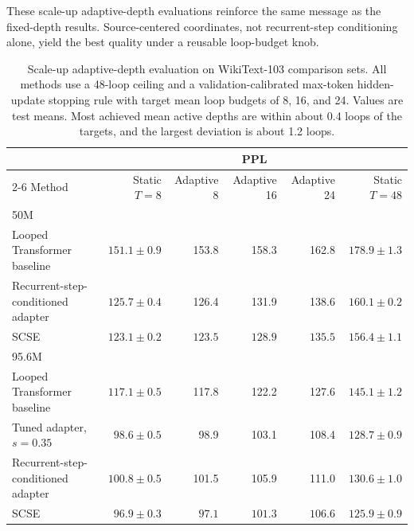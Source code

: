 \documentclass[letterpaper]{article} %
\newcommand{\SCSE}{\textsc{SCSE}}
\theoremstyle{remark}
\begin{document}
These scale-up adaptive-depth evaluations reinforce the same message as the fixed-depth results.  Source-centered coordinates, not recurrent-step conditioning alone, yield the best quality under a reusable loop-budget knob.

\begin{table}[t!]
	\centering
	\scriptsize
	\begin{tabular}{lrrrrr}
		\toprule
		                                   & \multicolumn{5}{c}{PPL}                                                                                   \\
		\cmidrule(lr){2-6}
		Method                             & Static $T=8$            & Adaptive 8       & Adaptive 16      & Adaptive 24      & Static $T=48$          \\
		\midrule
		\multicolumn{6}{l}{50M}                                                                                                                        \\
		Looped Transformer baseline        & $151.1\pm0.9$           & 153.8            & 158.3            & 162.8            & $178.9\pm1.3$          \\
		Recurrent-step-conditioned adapter & $125.7\pm0.4$           & 126.4            & 131.9            & 138.6            & $160.1\pm0.2$          \\
		\SCSE{}                            & $\mathbf{123.1\pm0.2}$  & $\mathbf{123.5}$ & $\mathbf{128.9}$ & $\mathbf{135.5}$ & $\mathbf{156.4\pm1.1}$ \\
		\midrule
		\multicolumn{6}{l}{95.6M}                                                                                                                      \\
		Looped Transformer baseline        & $117.1\pm0.5$           & 117.8            & 122.2            & 127.6            & $145.1\pm1.2$          \\
		Tuned adapter, $s=0.35$            & $98.6\pm0.5$            & 98.9             & 103.1            & 108.4            & $128.7\pm0.9$          \\
		Recurrent-step-conditioned adapter & $100.8\pm0.5$           & 101.5            & 105.9            & 111.0            & $130.6\pm1.0$          \\
		\SCSE{}                            & $\mathbf{96.9\pm0.3}$   & $\mathbf{97.1}$  & $\mathbf{101.3}$ & $\mathbf{106.6}$ & $\mathbf{125.9\pm0.9}$ \\
		\bottomrule
	\end{tabular}
	\caption{Scale-up adaptive-depth evaluation on WikiText-103 comparison sets.  All methods use a 48-loop ceiling and a validation-calibrated max-token hidden-update stopping rule with target mean loop budgets of 8, 16, and 24.  Values are test means.  Most achieved mean active depths are within about 0.4 loops of the targets, and the largest deviation is about 1.2 loops.}
	\label{tab:adaptive_scale}
\end{table}
\end{document}

